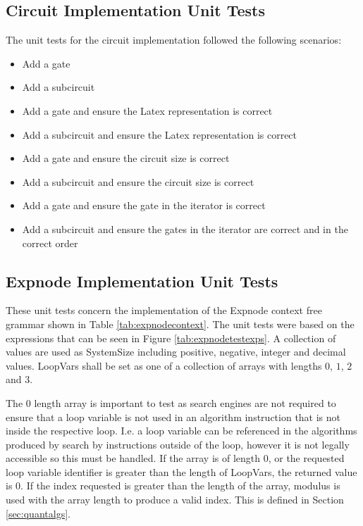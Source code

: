 \subsection{Circuit Implementation Unit Tests}
\label{sec:circtests}
The unit tests for the circuit implementation followed the following scenarios:
\begin{itemize}
 \item Add a gate
 \item Add a subcircuit
 \item Add a gate and ensure the Latex representation is correct
 \item Add a subcircuit and ensure the Latex representation is correct
 \item Add a gate and ensure the circuit size is correct
 \item Add a subcircuit and ensure the circuit size is correct
 \item Add a gate and ensure the gate in the iterator is correct
 \item Add a subcircuit and ensure the gates in the iterator are correct and in the correct order
\end{itemize}

\subsection{Expnode Implementation Unit Tests}
These unit tests concern the implementation of the Expnode context free grammar shown in Table \ref{tab:expnodecontext}.
The unit tests were based on the expressions that can be seen in Figure \ref{tab:expnodetestexps}.
A collection of values are used as SystemSize including positive, negative, integer and decimal values.
LoopVars shall be set as one of a collection of arrays with lengths $0$, $1$, $2$ and $3$.

The $0$ length array is important to test as search engines are not required to ensure that a loop variable is not used in an algorithm instruction that is not inside the respective loop.
I.e. a loop variable can be referenced in the algorithms produced by search by instructions outside of the loop, however it is not legally accessible so this must be handled.
If the array is of length $0$, or the requested loop variable identifier is greater than the length of LoopVars, the returned value is $0$.
If the index requested is greater than the length of the array, modulus is used with the array length to produce a valid index.
This is defined in Section \ref{sec:quantalgs}.

